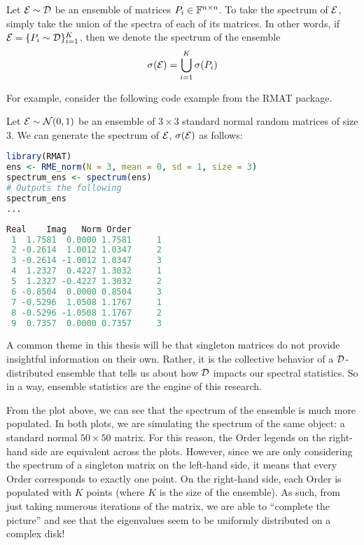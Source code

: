 \begin{definition}
Let $\mathcal{E} \sim \mathcal{D}$ be an ensemble of matrices $P_i \in \mathbb{F}^{n \times n}$. To take the spectrum of $\mathcal{E}$, simply take the union of the spectra of each of its matrices.
In other words, if $\mathcal{E} = \{P_i \sim \mathcal{D}\}_{i = 1}^K$, then we denote the spectrum of the ensemble
$$\sigma(\mathcal{E}) = \bigcup_{i=1}^K \sigma(P_i)$$
\end{definition}

\medskip
\noindent For example, consider the following code example from the RMAT package.
\begin{code}
Let $\mathcal{E} \sim \mathcal{N}(0,1)$ be an ensemble of $3 \times 3$ standard normal random matrices of size $3$. We can generate the spectrum of $\mathcal{E}$, $\sigma(\mathcal{E})$ as follows:
\end{code}

\begin{lstlisting}[language=R]
library(RMAT)
ens <- RME_norm(N = 3, mean = 0, sd = 1, size = 3)
spectrum_ens <- spectrum(ens)
# Outputs the following
spectrum_ens
...
\end{lstlisting}
\newpage
\begin{lstlisting}[language=R]
      Real    Imag   Norm Order
 1  1.7581  0.0000 1.7581     1
 2 -0.2614  1.0012 1.0347     2
 3 -0.2614 -1.0012 1.0347     3
 4  1.2327  0.4227 1.3032     1
 5  1.2327 -0.4227 1.3032     2
 6 -0.8504  0.0000 0.8504     3
 7 -0.5296  1.0508 1.1767     1
 8 -0.5296 -1.0508 1.1767     2
 9  0.7357  0.0000 0.7357     3
\end{lstlisting}


A common theme in this thesis will be that singleton matrices do not provide insightful information on their own.
Rather, it is the collective behavior of a $\mathcal{D}$-distributed ensemble that tells us about how $\mathcal{D}$ impacts our spectral statistics.
So in a way, ensemble statistics are the engine of this research.


From the plot above, we can see that the spectrum of the ensemble is much more populated.
In both plots, we are simulating the spectrum of the same object: a standard normal $50 \times 50$ matrix.
For this reason, the Order legends on the right-hand side are equivalent across the plots.
However, since we are only considering the spectrum of a singleton matrix on the left-hand side, it means that every Order corresponds to exactly one point.
On the right-hand side, each Order is populated with $K$ points (where $K$ is the size of the ensemble).
As such, from just taking numerous iterations of the matrix, we are able to ``complete the picture'' and see that the eigenvalues seem to be uniformly distributed on a complex disk!

